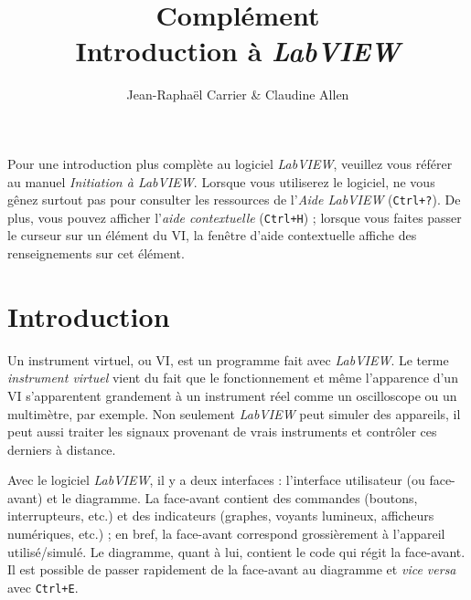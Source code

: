 \documentclass[12pt,oneside,letterpaper]{article}
\begin{document}
\title{\textbf{Complément}\\Introduction à \textit{LabVIEW}}
\author{Jean-Raphaël Carrier \& Claudine Allen}
\date{}
\maketitle


Pour une introduction plus complète au logiciel \textit{LabVIEW}, veuillez vous référer au manuel \textit{Initiation à LabVIEW}. Lorsque vous utiliserez le logiciel, ne vous gênez surtout pas pour consulter les ressources de l'\textit{Aide LabVIEW} (\texttt{Ctrl+?}). De plus, vous pouvez afficher l'\textit{aide contextuelle} (\texttt{Ctrl+H}) ; lorsque vous faites passer le curseur sur un élément du VI, la fenêtre d'aide contextuelle affiche des renseignements sur cet élément.


\section{Introduction}

Un instrument virtuel, ou VI, est un programme fait avec \textit{LabVIEW}. Le terme \textit{instrument virtuel} vient du fait que le fonctionnement et même l'apparence d'un VI s'apparentent grandement à un instrument réel comme un oscilloscope ou un multimètre, par exemple. Non seulement \textit{LabVIEW} peut simuler des appareils, il peut aussi traiter les signaux provenant de vrais instruments et contrôler ces derniers à distance.

Avec le logiciel \textit{LabVIEW}, il y a deux interfaces : l'interface utilisateur (ou face-avant) et le diagramme. La face-avant contient des commandes (boutons, interrupteurs, etc.) et des indicateurs (graphes, voyants lumineux, afficheurs numériques, etc.) ; en bref, la face-avant correspond grossièrement à l'appareil utilisé/simulé. Le diagramme, quant à lui, contient le code qui régit la face-avant. Il est possible de passer rapidement de la face-avant au diagramme et \textit{vice versa} avec \texttt{Ctrl+E}.
\end{document}
